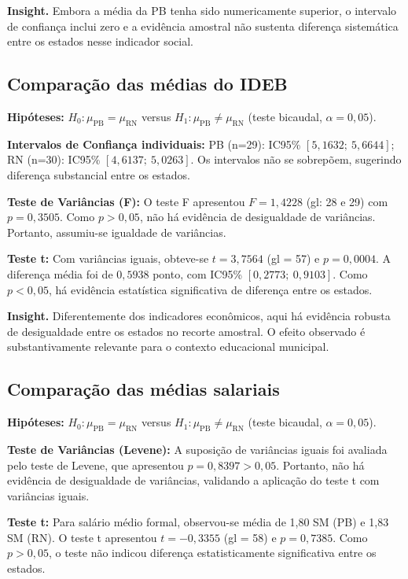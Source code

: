 \documentclass[10pt, a4paper, twocolumn]{article}
\begin{document}
\textbf{Insight.} Embora a média da PB tenha sido numericamente superior, o intervalo de confiança inclui zero e a evidência amostral não sustenta diferença sistemática entre os estados nesse indicador social.

\subsection{Comparação das médias do IDEB}

\textbf{Hipóteses:} $H_0: \mu_{\text{PB}} = \mu_{\text{RN}}$ versus $H_1: \mu_{\text{PB}} \neq \mu_{\text{RN}}$ (teste bicaudal, $\alpha = 0{,}05$).

\textbf{Intervalos de Confiança individuais:} PB (n=29): IC95\% $[5{,}1632;\ 5{,}6644]$; RN (n=30): IC95\% $[4{,}6137;\ 5{,}0263]$. Os intervalos não se sobrepõem, sugerindo diferença substancial entre os estados.

\textbf{Teste de Variâncias (F):} O teste F apresentou $F = 1{,}4228$ (gl: 28 e 29) com $p = 0{,}3505$. Como $p > 0{,}05$, não há evidência de desigualdade de variâncias. Portanto, assumiu-se igualdade de variâncias.

\textbf{Teste t:} Com variâncias iguais, obteve-se $t = 3{,}7564$ (gl = 57) e $p = 0{,}0004$. A diferença média foi de $0{,}5938$ ponto, com IC95\% $[0{,}2773;\ 0{,}9103]$. Como $p < 0{,}05$, há evidência estatística significativa de diferença entre os estados.

\textbf{Insight.} Diferentemente dos indicadores econômicos, aqui há evidência robusta de desigualdade entre os estados no recorte amostral. O efeito observado é substantivamente relevante para o contexto educacional municipal.

\subsection{Comparação das médias salariais}

\textbf{Hipóteses:} $H_0: \mu_{\text{PB}} = \mu_{\text{RN}}$ versus $H_1: \mu_{\text{PB}} \neq \mu_{\text{RN}}$ (teste bicaudal, $\alpha = 0{,}05$).

\textbf{Teste de Variâncias (Levene):} A suposição de variâncias iguais foi avaliada pelo teste de Levene, que apresentou $p = 0{,}8397 > 0{,}05$. Portanto, não há evidência de desigualdade de variâncias, validando a aplicação do teste t com variâncias iguais.

\textbf{Teste t:} Para salário médio formal, observou-se média de 1,80 SM (PB) e 1,83 SM (RN). O teste t apresentou $t = -0{,}3355$ (gl = 58) e $p = 0{,}7385$. Como $p > 0{,}05$, o teste não indicou diferença estatisticamente significativa entre os estados.
\end{document}
